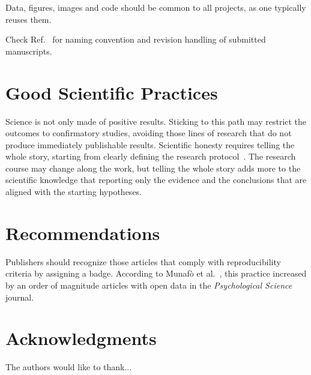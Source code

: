 \documentclass[journal]{IEEEtran}
\begin{document}
Data, figures, images and code should be common to all projects, as one typically reuses them.

Check Ref.~\cite{EditorialGRSL2015} for naming convention and revision handling of submitted manuscripts.


\section{Good Scientific Practices}

Science is not only made of positive results.
Sticking to this path may restrict the outcomes to confirmatory studies, avoiding those lines of research that do not produce immediately publishable results.
Scientific honesty requires telling the whole story, starting from clearly defining the research protocol~\cite{TellItlikeItIs}.
The research course may change along the work, but telling the whole story adds more to the scientific knowledge that reporting only the evidence and the conclusions that are aligned with the starting hypotheses.

\section{Recommendations}

Publishers should recognize those articles that comply with reproducibility criteria by assigning a badge.
According to Munaf\`o et al.~\cite{ManifestoReproducibleScience}, this practice increased by an order of magnitude articles with open data in the \textit{Psychological Science} journal.

	
\section*{Acknowledgments}
The authors would like to thank...
	
\nocite{StatisticalAnalysesReproducibleResearch,%
RRComputationalHarmonicAnalysis,%
RREconometrics,%
RRSignalProcessing,%
AddressingNeedDataCodeSharingComputationalScience,%
ReproducibleResearchinComputationalScience,%
TenRulesReproducibleComputationalResearch,%
AddressingNeedDataCodeSharingComputationalSciencePublishingComputationalResearchaReviewofInfrastructuresforReproducibleandTransparentScholarlyCommunication,%
SevenReasonsWhyaUsersGuidetoTransparencyandReproducibility,%
OutoftheBoxReproducibilityaSurveyofMachineLearningPlatforms,%
ReproducibilityofScientificResults2018,%
ReproducibleResearchandGIScienceanEvaluationUsingAGILEConferencePapers,%
TheStateofReproducibilityintheComputationalGeosciences}
	


	

	
\end{document}
